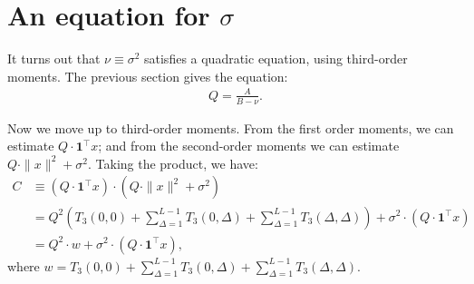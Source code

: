 \documentclass{article}
\theoremstyle{thm}
\theoremstyle{definition}
\newcommand{\1}{\mathbf{1}}
\begin{document}
%
%
%
%

\section{An equation for $\sigma$}

It turns out that $\nu \equiv \sigma^2$ satisfies a quadratic equation, using third-order moments. The previous section gives the equation:
%
\begin{align}
%
    Q = \frac{A}{B - \nu}.
%
\end{align}

Now we move up to third-order moments. From the first order moments, we can estimate $Q \cdot \1^\top x$; and from the second-order moments we can estimate $Q \cdot \|x\|^2 + \sigma^2$. Taking the product, we have:
%
\begin{align}
%
    C &\equiv (Q \cdot \1^\top x) \cdot (Q \cdot \|x\|^2 + \sigma^2)
        \nonumber \\
    &= Q^2 \left( T_3(0,0) + \sum_{\Delta=1}^{L-1}T_3(0,\Delta) 
        + \sum_{\Delta=1}^{L-1}T_3(\Delta,\Delta) \right)
        + \sigma^2 \cdot (Q \cdot \1^\top x)
        \nonumber \\
    &= Q^2 \cdot w + \sigma^2 \cdot (Q \cdot \1^\top x),
%
\end{align}
%
where 
%
\begin{math}
%
    w = T_3(0,0) + \sum_{\Delta=1}^{L-1}T_3(0,\Delta) 
        + \sum_{\Delta=1}^{L-1}T_3(\Delta,\Delta).
%
\end{math}
\end{document}
